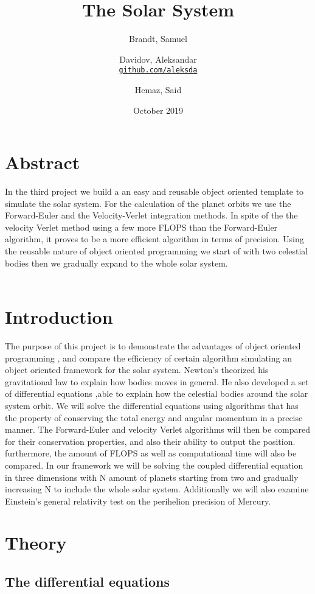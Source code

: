 \documentclass{article}
\title{The Solar System}
\author{
  Brandt, Samuel\\
  \and
  Davidov, Aleksandar\\
  \textcolor{blue}{\href{https://github.com/aleksda/FYS4150/}{\texttt{github.com/aleksda}}}
  \and
  Hemaz, Said\\
}
\date{October 2019}
\begin{document}
\maketitle

\section{Abstract}
In the third project we build a an easy and reusable object oriented template to simulate the solar system. For the calculation of the planet orbits we use the Forward-Euler and the Velocity-Verlet integration methods. In spite of the the velocity Verlet method using a few  more FLOPS than the Forward-Euler algorithm, it proves to be a more efficient algorithm in terms of precision. Using the reusable nature of object oriented programming we start of with two celestial bodies then we gradually expand to the whole solar system.\\\\
\tableofcontents
\newpage
\section{Introduction}
The purpose of this project is to demonstrate the advantages of object oriented programming , and compare the efficiency of certain algorithm simulating an object oriented framework for the solar system. Newton's theorized his gravitational law to explain how bodies moves in general. He also developed a set of differential equations ,able to explain how the celestial bodies around the solar system orbit. We will solve the differential equations using algorithms that has the property of conserving the total energy and angular momentum in a precise manner. The Forward-Euler and velocity Verlet algorithms will then be compared for their conservation properties, and also their ability to output the position. furthermore, the amount of FLOPS as well as computational time will also be compared.   In our framework we will be solving the coupled differential equation in three dimensions with N amount of planets starting from two and gradually increasing N to include the whole solar system. Additionally we will also examine Einstein's general relativity test on the perihelion precision of Mercury.


\section{Theory}
\subsection{The differential equations}
\end{document}
